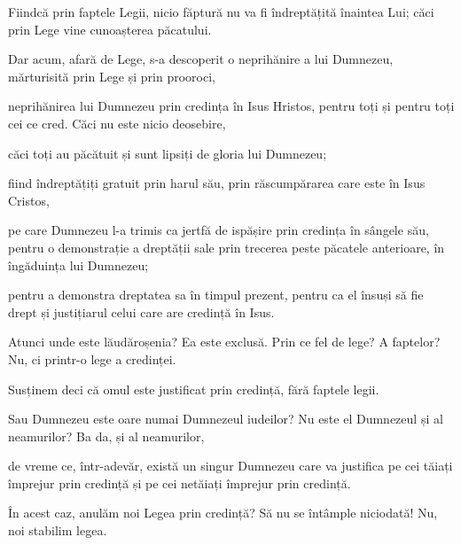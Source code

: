 {Fiindcă prin faptele Legii, nicio făptură nu va fi îndreptățită înaintea Lui; căci prin Lege vine cunoașterea păcatului.


\par }{\PP {}Dar acum, afară de Lege, s-a descoperit o neprihănire a lui Dumnezeu, mărturisită prin Lege și prin prooroci,

neprihănirea lui Dumnezeu prin credința în Isus Hristos, pentru toți și pentru toți cei ce cred. Căci nu este nicio deosebire,

căci toți au păcătuit și sunt lipsiți de gloria lui Dumnezeu;

fiind îndreptățiți gratuit prin harul său, prin răscumpărarea care este în Isus Cristos,

pe care Dumnezeu l-a trimis ca jertfă de ispășire prin credința în sângele său, pentru o demonstrație a dreptății sale prin trecerea peste păcatele anterioare, în îngăduința lui Dumnezeu;

pentru a demonstra dreptatea sa în timpul prezent, pentru ca el însuși să fie drept și justițiarul celui care are credință în Isus.


\par }{\PP {}Atunci unde este lăudăroșenia? Ea este exclusă. Prin ce fel de lege? A faptelor? Nu, ci printr-o lege a credinței.

Susținem deci că omul este justificat prin credință, fără faptele legii.

Sau Dumnezeu este oare numai Dumnezeul iudeilor? Nu este el Dumnezeul și al neamurilor? Ba da, și al neamurilor,

de vreme ce, într-adevăr, există un singur Dumnezeu care va justifica pe cei tăiați împrejur prin credință și pe cei netăiați împrejur prin credință.


\par }{\PP {}În acest caz, anulăm noi Legea prin credință? Să nu se întâmple niciodată! Nu, noi stabilim legea.



\par }
